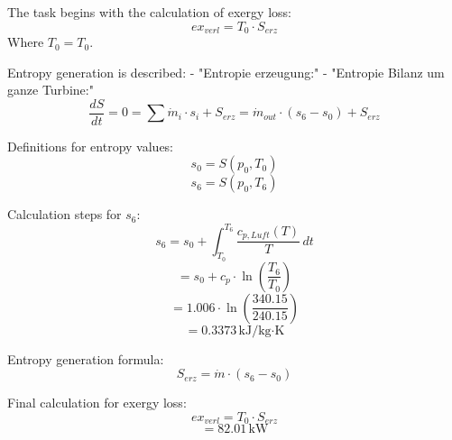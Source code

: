 The task begins with the calculation of exergy loss:  
\[ ex_{verl} = T_0 \cdot S_{erz} \]  
Where \( T_0 = T_0 \).  

Entropy generation is described:  
- "Entropie erzeugung:"  
- "Entropie Bilanz um ganze Turbine:"  
\[ \frac{dS}{dt} = 0 = \sum \dot{m}_i \cdot s_i + S_{erz} = \dot{m}_{out} \cdot (s_6 - s_0) + S_{erz} \]  

Definitions for entropy values:  
\[ s_0 = S(p_0, T_0) \]  
\[ s_6 = S(p_0, T_6) \]  

Calculation steps for \( s_6 \):  
\[ s_6 = s_0 + \int_{T_0}^{T_6} \frac{c_{p, Luft}(T)}{T} \, dt \]  
\[ = s_0 + c_{p} \cdot \ln \left( \frac{T_6}{T_0} \right) \]  
\[ = 1.006 \cdot \ln \left( \frac{340.15}{240.15} \right) \]  
\[ = 0.3373 \, \text{kJ/kg·K} \]  

Entropy generation formula:  
\[ S_{erz} = \dot{m} \cdot (s_6 - s_0) \]  

Final calculation for exergy loss:  
\[ ex_{verl} = T_0 \cdot S_{erz} \]  
\[ = 82.01 \, \text{kW} \]